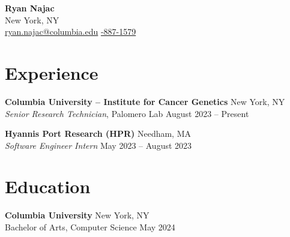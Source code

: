 \documentclass[11pt,a4paper]{article}   %
\providecommand{\bulletsdir}{original}
\newcommand{\jobbullets}[1]{%
  \begin{itemize}%
  \end{itemize}%
}
\begin{document}
\raggedright                            %
\thispagestyle{empty}                   %

\begin{center}
  {\LARGE \textbf{Ryan Najac} }\\
  {\large
    \vspace{0.1cm}New York, NY\\ \vspace{0.1cm}
    \href{mailto:ryan.najac@columbia.edu}{\faEnvelopeSquare\: ryan.najac@columbia.edu} \medspace
    \href{tel:+17188871579}{\faPhoneSquare{}-887-1579}                             \medspace \\
    \href{https://rdnajac.tech/}{\faGlobe\:             \underline{}} \quad
    \href{https://github.com/rdnajac}{\faGithubSquare\: \underline{}}          \quad
    \href{https://www.linkedin.com/in/ryan-najac/}{\faLinkedinSquare\:  \underline{}}
  }
\end{center}
\vspace{-0.6cm}

\section*{Experience} %

\textbf{Columbia University – Institute for Cancer Genetics} \hfill New York, NY\\
\textit{Senior Research Technician}, Palomero Lab \hfill August 2023 – Present
\jobbullets{columbia}
\vspace{0.2cm}

\textbf{Hyannis Port Research (HPR)} \hfill Needham, MA\\
\textit{Software Engineer Intern} \hfill May 2023 – August 2023
\jobbullets{hpr}
\vspace{0.2cm}

\section*{Education} %
\textbf{Columbia University} \hfill New York, NY\\
Bachelor of Arts, Computer Science \hfill May 2024
\end{document}
